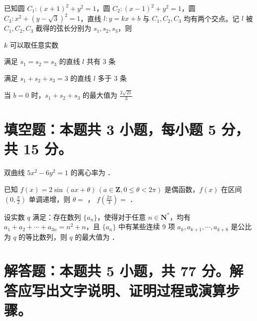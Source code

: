 \documentclass{exam-zh}
\begin{document}
\begin{question}
  已知圆 $C_1: (x+1)^2 + y^2 = 1$，圆 $C_2: (x-1)^2 + y^2 = 1$，圆 $C_3: x^2 + (y-\sqrt{3})^2 = 1$，直线 $l: y = kx + b$ 与 $C_1, C_2, C_3$ 均有两个交点。记 $l$ 被 $C_1, C_2, C_3$ 截得的弦长分别为 $s_1, s_2, s_3$，则 \paren
  \begin{choices}
    \item $k$ 可以取任意实数
    \item 满足 $s_1 = s_2 = s_3$ 的直线 $l$ 共有 3 条
    \item 满足 $s_1 + s_2 + s_3 = 3$ 的直线 $l$ 多于 3 条
    \item 当 $b = 0$ 时，$s_1 + s_2 + s_3$ 的最大值为 $\frac{2\sqrt{21}}{3}$
  \end{choices}
\end{question}

\section{填空题：本题共 3 小题，每小题 5 分，共 15 分。}

\begin{question}
  双曲线 $5x^2 - 6y^2 = 1$ 的离心率为 \fillin．
\end{question}

\begin{question}
  已知 $f(x) = 2\sin(ax + \theta) \, (a \in \mathbf{Z}, 0 \leqslant \theta < 2\pi)$ 是偶函数，$f(x)$ 在区间 $\left(0, \frac{\pi}{2}\right)$ 单调递增，则 $\theta =$ \fillin， $f\left(\frac{2\pi}{3}\right) =$ \fillin．
\end{question}

\begin{question}
  设实数 $q$ 满足：存在数列 $\{a_n\}$，使得对于任意 $n \in \mathbf{N}^*$，均有 $a_1 + a_2 + \cdots + a_{3n} = n^2 + n$，且 $\{a_n\}$ 中有某些连续 9 项 $a_k, a_{k+1}, \cdots, a_{k+8}$ 是公比为 $q$ 的等比数列，则 $q$ 的最大值为 \fillin．
\end{question}

\section{解答题：本题共 5 小题，共 77 分。解答应写出文字说明、证明过程或演算步骤。}
\end{document}
